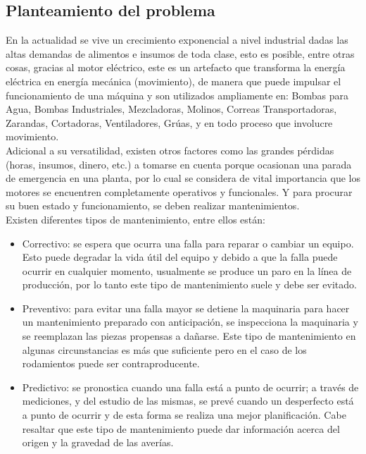 \setcounter{page}{1}

\begin{center}
	\section{Planteamiento del problema}
\end{center}



	En la actualidad se vive un crecimiento exponencial a nivel industrial dadas las altas demandas de alimentos e insumos de toda clase, esto es posible, entre otras cosas, gracias al motor eléctrico, este es un artefacto que transforma la energía eléctrica en energía mecánica (movimiento), de manera que puede impulsar el funcionamiento de una máquina y son utilizados ampliamente en: Bombas para Agua, Bombas Industriales, Mezcladoras, Molinos, Correas Transportadoras, Zarandas, Cortadoras, Ventiladores, Grúas, y en todo proceso que involucre movimiento.\\


	Adicional a su versatilidad, existen otros factores como las grandes pérdidas (horas, insumos, dinero, etc.) a tomarse en cuenta porque ocasionan una parada de emergencia en una planta, por lo cual se considera de vital importancia que los motores se encuentren completamente operativos y funcionales. Y para procurar su buen estado y funcionamiento, se deben realizar mantenimientos.\\



	Existen diferentes tipos de mantenimiento, entre ellos están:
	\begin{itemize}
		\item Correctivo: se espera que ocurra una falla para reparar o cambiar un equipo. Esto puede degradar la vida útil del equipo y debido a que la falla puede ocurrir en cualquier momento, usualmente se produce un paro en la línea de producción, por lo tanto este tipo de mantenimiento suele y debe ser evitado.

		\item Preventivo: para evitar una falla mayor se detiene la maquinaria para hacer un mantenimiento preparado con anticipación, se inspecciona la maquinaria y se reemplazan las piezas propensas a dañarse. Este tipo de mantenimiento en algunas circunstancias es más que suficiente pero en el caso de los rodamientos puede ser contraproducente.

		\item Predictivo: se pronostica cuando una falla está a punto de ocurrir; a través de mediciones, y del estudio de las mismas, se prevé cuando un desperfecto está a punto de ocurrir y de esta forma se realiza una mejor planificación. Cabe resaltar que este tipo de mantenimiento puede dar información acerca del origen y la gravedad de las averías.
	\end{itemize}


